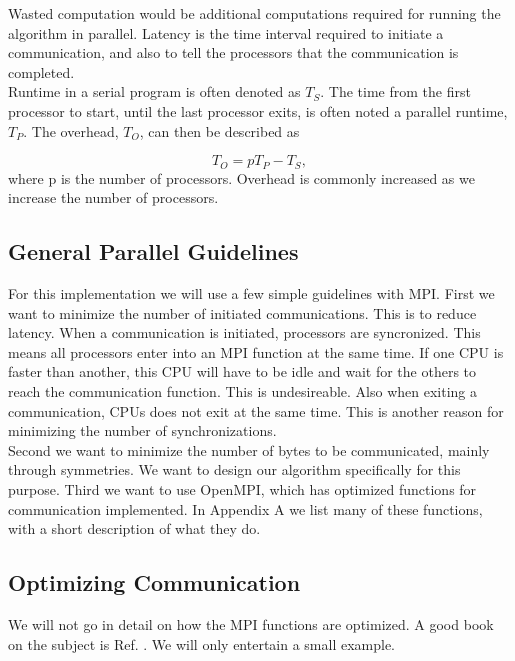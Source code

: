 Wasted computation would be additional computations required for running the algorithm in parallel. Latency is the time interval required to initiate a communication, and also to tell the processors that the communication is completed. \\

Runtime in a serial program is often denoted as $T_S$. The time from the first processor to start, until the last processor exits, is often noted a parallel runtime, $T_P$. The overhead, $T_O$, can then be described as

\begin{equation}
T_O = p T_P - T_S ,
\end{equation}
where p is the number of processors. Overhead is commonly increased as we increase the number of processors.

\subsection{General Parallel Guidelines}
For this implementation we will use a few simple guidelines with MPI. First we want to minimize the number of initiated communications. This is to reduce latency. When a communication is initiated, processors are syncronized. This means all processors enter into an MPI function at the same time. If one CPU is faster than another, this CPU will have to be idle and wait for the others to reach the communication function. This is undesireable. Also when exiting a communication, CPUs does not exit at the same time. This is another reason for minimizing the number of synchronizations. \\

Second we want to minimize the number of bytes to be communicated, mainly through symmetries. We want to design our algorithm specifically for this purpose. Third we want to use OpenMPI, which has optimized functions for communication implemented. In Appendix A we list many of these functions, with a short description of what they do.

\subsection{Optimizing Communication}

We will not go in detail on how the MPI functions are optimized. A good book on the subject is Ref. \cite{mpi_boka_cite_referanse}. We will only entertain a small example. \\

